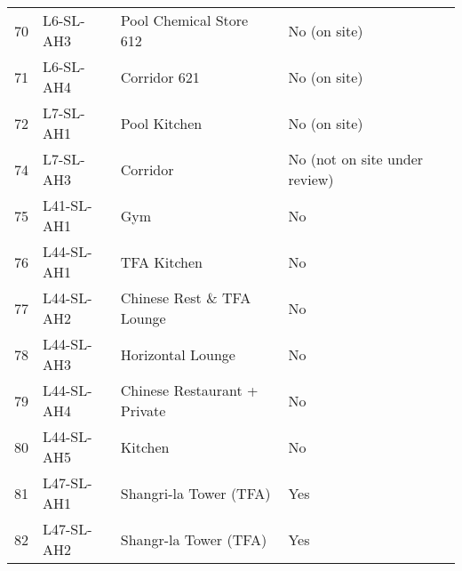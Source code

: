 \begin{table}[htbp]
\begin{tabular}{llp{3.2cm}p{3.0cm}l}
 
\midrule
 70	 	 &L6-SL-AH3	 &Pool Chemical Store 612	 &No (on site)  &\ahutwo \\
 71	 	 &L6-SL-AH4	 &Corridor 621	 	 	 &No (on site) &\ahutwo \\
\midrule



 72	 	 &L7-SL-AH1	 &Pool Kitchen	 	 	  &No (on site)  &\ahutwo\\
 
 74	 	 &L7-SL-AH3	 &Corridor	 	 	 &No (not on site under review)  &\ahuverylate\\
 75	 	 &L41-SL-AH1	 &Gym	 	 	  	 &No	 &\ahuone \\
 76	 	 &L44-SL-AH1	 &TFA Kitchen	 	 	 &No 	 &\ahuone\\	 
 77	 	 &L44-SL-AH2	 &Chinese Rest \& TFA Lounge	 	&No  &\ahuone \\ 	  	 	 
 78	 	 &L44-SL-AH3	 &Horizontal Lounge	 	 	&No  &\ahuone \\	 	 
 79	 	 &L44-SL-AH4	 &Chinese Restaurant + Private	&No  &\ahuone \\	 	 
 80	 	 &L44-SL-AH5	 &Kitchen	 	 	  	&No 	&\ahuone \\ 
\midrule

 81	 	 &L47-SL-AH1	 &Shangri-la Tower (TFA)	 	  	&Yes	 &\\
 82	 	 &L47-SL-AH2	 &Shangr-la Tower (TFA)	 		&Yes	 &\\
\bottomrule
\end{tabular}

\end{table}











